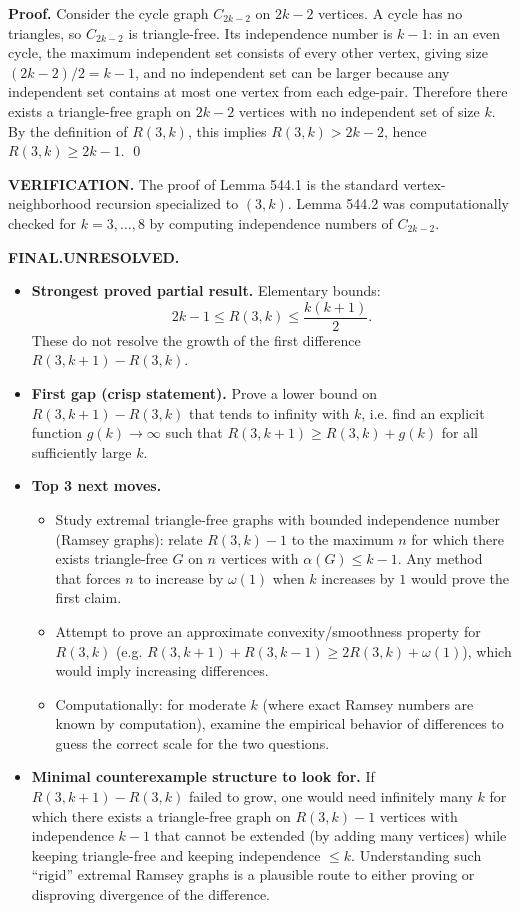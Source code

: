 \textbf{Proof.}
Consider the cycle graph $C_{2k-2}$ on $2k-2$ vertices.
A cycle has no triangles, so $C_{2k-2}$ is triangle-free.
Its independence number is $k-1$: in an even cycle, the maximum independent set consists of every other vertex, giving size $(2k-2)/2=k-1$, and no independent set can be larger because any independent set contains at most one vertex from each edge-pair.
Therefore there exists a triangle-free graph on $2k-2$ vertices with no independent set of size $k$.
By the definition of $R(3,k)$, this implies $R(3,k)>2k-2$, hence $R(3,k)\ge 2k-1$. \qed

\noindent\textbf{VERIFICATION.}
The proof of Lemma 544.1 is the standard vertex-neighborhood recursion specialized to $(3,k)$.
Lemma 544.2 was computationally checked for $k=3,\dots,8$ by computing independence numbers of $C_{2k-2}$.

\noindent\textbf{FINAL.}\;\textbf{UNRESOLVED.}
\begin{itemize}
\item[(i)] \textbf{Strongest proved partial result.} Elementary bounds:
\[2k-1\le R(3,k)\le \frac{k(k+1)}{2}.
\]
These do not resolve the growth of the first difference $R(3,k+1)-R(3,k)$.
\item[(ii)] \textbf{First gap (crisp statement).} Prove a lower bound on $R(3,k+1)-R(3,k)$ that tends to infinity with $k$, i.e. find an explicit function $g(k)\to\infty$ such that $R(3,k+1)\ge R(3,k)+g(k)$ for all sufficiently large $k$.
\item[(iii)] \textbf{Top 3 next moves.}
  \begin{itemize}
  \item Study extremal triangle-free graphs with bounded independence number (Ramsey graphs): relate $R(3,k)-1$ to the maximum $n$ for which there exists triangle-free $G$ on $n$ vertices with $\alpha(G)\le k-1$. Any method that forces $n$ to increase by $\omega(1)$ when $k$ increases by $1$ would prove the first claim.
  \item Attempt to prove an approximate convexity/smoothness property for $R(3,k)$ (e.g. $R(3,k+1)+R(3,k-1)\ge 2R(3,k)+\omega(1)$), which would imply increasing differences.
  \item Computationally: for moderate $k$ (where exact Ramsey numbers are known by computation), examine the empirical behavior of differences to guess the correct scale for the two questions.
  \end{itemize}
\item[(iv)] \textbf{Minimal counterexample structure to look for.} If $R(3,k+1)-R(3,k)$ failed to grow, one would need infinitely many $k$ for which there exists a triangle-free graph on $R(3,k)-1$ vertices with independence $k-1$ that cannot be extended (by adding many vertices) while keeping triangle-free and keeping independence $\le k$. Understanding such ``rigid'' extremal Ramsey graphs is a plausible route to either proving or disproving divergence of the difference.
\end{itemize}


